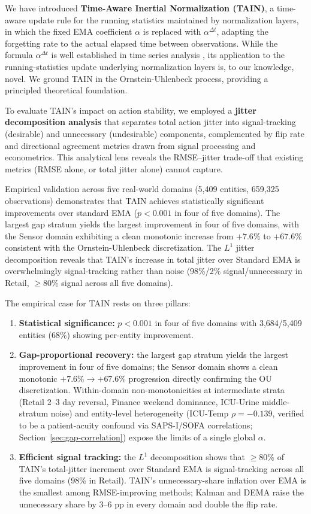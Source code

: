 \documentclass[11pt,a4paper]{article}
\begin{document}
We have introduced \textbf{Time-Aware Inertial Normalization (TAIN)}, a
time-aware update rule for the running statistics maintained by normalization
layers, in which the fixed EMA coefficient $\alpha$ is replaced with
$\alpha^{\Delta t}$, adapting the forgetting rate to the actual elapsed time
between observations. While the formula $\alpha^{\Delta t}$ is well established
in time series analysis \citep{wright1986,zumbach2001operators}, its application
to the running-statistics update underlying normalization layers is, to our
knowledge, novel. We ground TAIN in the Ornstein-Uhlenbeck process, providing a principled
theoretical foundation.

To evaluate TAIN's impact on action stability, we employed a \textbf{jitter
decomposition analysis} that separates total action jitter into signal-tracking
(desirable) and unnecessary (undesirable) components, complemented by flip rate
and directional agreement metrics drawn from signal processing and econometrics.
This analytical lens reveals the RMSE--jitter trade-off that existing metrics
(RMSE alone, or total jitter alone) cannot capture.

Empirical validation across five real-world domains (5{,}409 entities, 659{,}325
observations) demonstrates that TAIN achieves statistically significant
improvements over standard EMA ($p < 0.001$ in four of five domains). The
largest gap stratum yields the largest improvement in four of five domains,
with the Sensor domain exhibiting a clean monotonic increase from $+7.6\%$ to
$+67.6\%$ consistent with the Ornstein-Uhlenbeck discretization. The $L^1$ jitter decomposition reveals that TAIN's increase
in total jitter over Standard EMA is overwhelmingly signal-tracking rather than
noise (98\%/2\% signal/unnecessary in Retail, $\geq 80\%$ signal across all
five domains).

The empirical case for TAIN rests on three pillars:
\begin{enumerate}
\item \textbf{Statistical significance:} $p < 0.001$ in four of five domains
with 3{,}684/5{,}409 entities (68\%) showing per-entity improvement.
\item \textbf{Gap-proportional recovery:} the largest gap stratum yields the
largest improvement in four of five domains; the Sensor domain shows a clean
monotonic $+7.6\% \to +67.6\%$ progression directly confirming the OU
discretization. Within-domain non-monotonicities at intermediate strata
(Retail 2--3 day reversal, Finance weekend dominance, ICU-Urine middle-stratum
noise) and entity-level heterogeneity (ICU-Temp $\rho = -0.139$, verified to
be a patient-acuity confound via SAPS-I/SOFA correlations; Section~\ref{sec:gap-correlation})
expose the limits of a single global $\alpha$.
\item \textbf{Efficient signal tracking:} the $L^1$ decomposition shows that
$\geq 80\%$ of TAIN's total-jitter increment over Standard EMA is signal-tracking
across all five domains (98\% in Retail). TAIN's unnecessary-share inflation
over EMA is the smallest among RMSE-improving methods; Kalman and DEMA raise
the unnecessary share by 3--6 pp in every domain and double the flip rate.
\end{enumerate}
\end{document}
